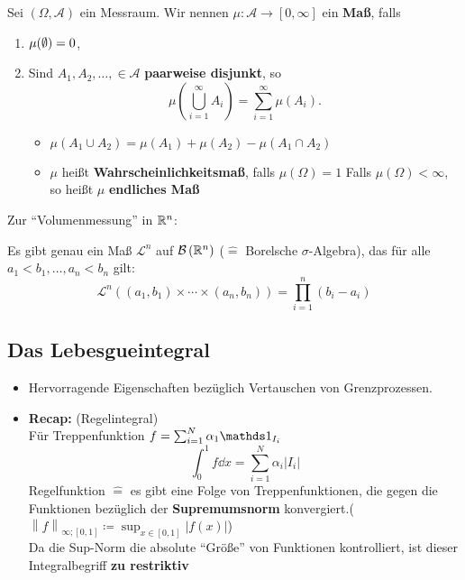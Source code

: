 \begin{definition}
	Sei $ (\Omega, \mathcal{A} ) $ ein Messraum.
	Wir nennen $ \mu : \mathcal{A} \to [0, \infty]  $ ein \textbf{Maß}, falls
	\begin{enumerate}[label=(\roman*)]
		\item $ \mu ( \emptyset ) = 0 $,
		\item Sind $ A_1, A_2, \dotsc, \in \mathcal{A}  $ \textbf{paarweise disjunkt}, so
			\[
				\mu \left( \bigcup_{i = 1} ^{\infty} A_i \right) = \sum_{i=1}^{\infty} \mu(A_i).
			\]
			\begin{itemize}
				\item $ \mu (A_1 \cup A_2) = \mu(A_1) + \mu(A_2) - \mu(A_1 \cap A_2) $
				\item $ \mu $ heißt \textbf{Wahrscheinlichkeitsmaß}, falls $ \mu(\Omega) = 1 $
					Falls $ \mu(\Omega) < \infty $, so heißt $ \mu $ \textbf{endliches Maß}
			\end{itemize}
	\end{enumerate}
\end{definition}

Zur ``Volumenmessung'' in $ \mathbb{R} ^n $:
\begin{theorem}
	Es gibt  genau ein Maß $ \mathcal{L} ^n $ auf $ \mathcal{B} \left( \mathbb{R} ^n \right)  $ ($ \hat{=}  $ Borelsche $ \sigma $-Algebra), das für alle $ a_1 <b_1, \dotsc, a_n < b_n $ gilt:
	\[
		\mathcal{L} ^n \left( (a_1, b_1) \times \dotsb \times (a_n, b_n) \right) = \prod_{i=1}^{n} (b_i - a_i) 
	\]
\end{theorem}

\subsection{Das Lebesgueintegral}
\begin{itemize}
	\item Hervorragende Eigenschaften bezüglich Vertauschen von Grenzprozessen.
	\item \textbf{Recap:} (Regelintegral)\\
		Für Treppenfunktion $ f = \sum_{i=1}^{N} \alpha_1 \I_{I_i} $
		\[
			\int_{0}^{1}f \dd x = \sum_{i=1}^{N} \alpha_i \left| I_i \right| 
		\]
		Regelfunktion $ \hat{=}  $ es gibt eine Folge von Treppenfunktionen, die gegen die Funktionen bezüglich der \textbf{Supremumsnorm} konvergiert.($ \left\| f \right\| _{\infty;[0, 1]} \coloneqq \sup_{x \in [0, 1]} \left| f(x) \right|  $)\\
		Da die Sup-Norm die absolute ``Größe'' von Funktionen kontrolliert, ist dieser Integralbegriff \textbf{zu restriktiv}
\end{itemize}

